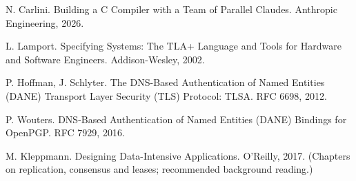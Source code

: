 \begin{english}
\begin{enumerate}[label={[\arabic*]},leftmargin=2.6em,itemsep=2pt]
\item N. Carlini. Building a C Compiler with a Team of Parallel Claudes. Anthropic Engineering, 2026.
\item L. Lamport. Specifying Systems: The TLA+ Language and Tools for Hardware and Software Engineers. Addison-Wesley, 2002.
\item P. Hoffman, J. Schlyter. The DNS-Based Authentication of Named Entities (DANE) Transport Layer Security (TLS) Protocol: TLSA. RFC 6698, 2012.
\item P. Wouters. DNS-Based Authentication of Named Entities (DANE) Bindings for OpenPGP. RFC 7929, 2016.
\item M. Kleppmann. Designing Data-Intensive Applications. O'Reilly, 2017. (Chapters on replication, consensus and leases; recommended background reading.)
\end{enumerate}
\end{english}
